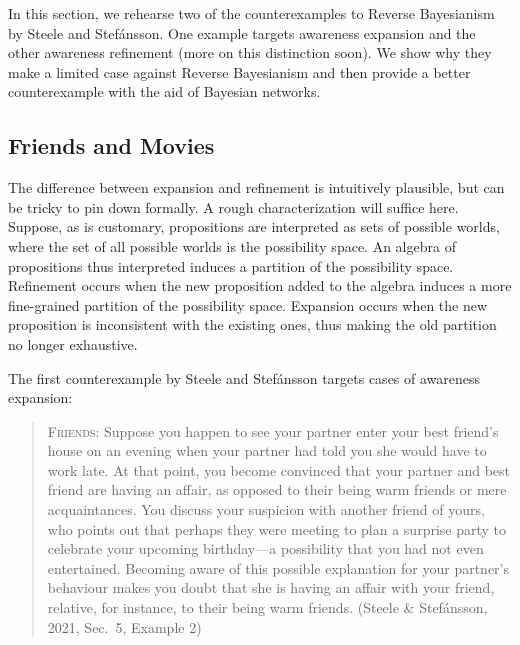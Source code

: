 \documentclass[
  11pt,
  dvipsnames,enabledeprecatedfontcommands]{scrartcl}
\begin{document}
In this section, we rehearse two of the counterexamples to Reverse
Bayesianism by Steele and Stefánsson. One example targets awareness
expansion and the other awareness refinement (more on this distinction
soon). We show why they make a limited case against Reverse Bayesianism
and then provide a better counterexample with the aid of Bayesian
networks.

\hypertarget{friends-and-movies}{%
\subsection{Friends and Movies}\label{friends-and-movies}}

\label{sec:counterexamples}

The difference between expansion and refinement is intuitively
plausible, but can be tricky to pin down formally. A rough
characterization will suffice here. Suppose, as is customary,
propositions are interpreted as sets of possible worlds, where the set
of all possible worlds is the possibility space. An algebra of
propositions thus interpreted induces a partition of the possibility
space. Refinement occurs when the new proposition added to the algebra
induces a more fine-grained partition of the possibility space.
Expansion occurs when the new proposition is inconsistent with the
existing ones, thus making the old partition no longer exhaustive.

The first counterexample by Steele and Stefánsson targets cases of
awareness expansion:

\begin{quote}
\textsc{Friends}: Suppose you happen to see your partner enter your best
friend's house on an evening when your partner had told you she would
have to work late. At that point, you become convinced that your partner
and best friend are having an affair, as opposed to their being warm
friends or mere acquaintances. You discuss your suspicion with another
friend of yours, who points out that perhaps they were meeting to plan a
surprise party to celebrate your upcoming birthday---a possibility that
you had not even entertained. Becoming aware of this possible
explanation for your partner's behaviour makes you doubt that she is
having an affair with your friend, relative, for instance, to their
being warm friends. (Steele \& Stefánsson, 2021, Sec.~5, Example 2)
\end{quote}

\doublespace
\end{document}
